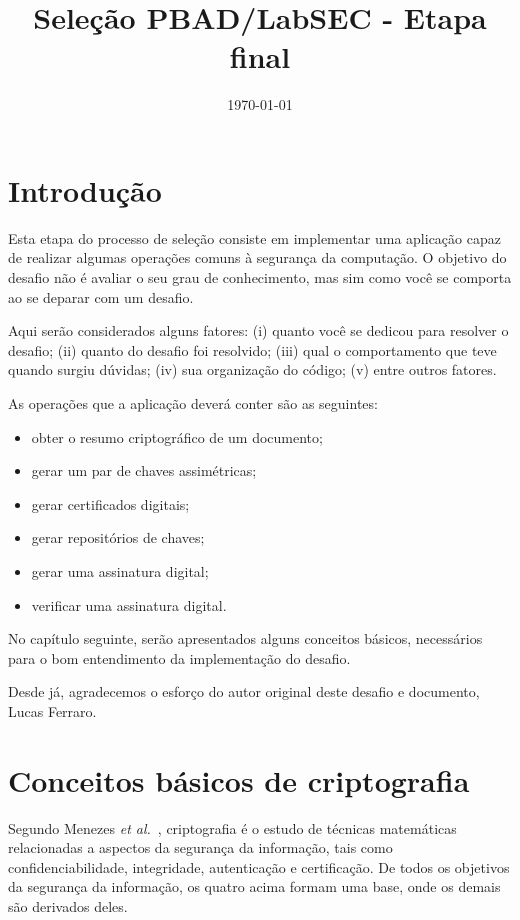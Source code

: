 \documentclass{article}
\title{Seleção PBAD/LabSEC - Etapa final}
\author{}
\date{\today}
\begin{document}
\maketitle

\section{Introdução}\label{sec:intro}

Esta etapa do processo de seleção consiste em implementar uma aplicação capaz
de realizar algumas operações comuns à segurança da computação. O objetivo do
desafio não é avaliar o seu grau de conhecimento, mas sim como você se comporta
ao se deparar com um desafio.

Aqui serão considerados alguns fatores: (i) quanto você se dedicou para
resolver o desafio; (ii) quanto do desafio foi resolvido; (iii) qual
o comportamento que teve quando surgiu dúvidas; (iv) sua organização do código;
(v) entre outros fatores.

As operações que a aplicação deverá conter são as seguintes:

\begin{itemize}
  \item obter o resumo criptográfico de um documento;
  \item gerar um par de chaves assimétricas;
  \item gerar certificados digitais;
  \item gerar repositórios de chaves;
  \item gerar uma assinatura digital;
  \item verificar uma assinatura digital.
\end{itemize}

No capítulo seguinte, serão apresentados alguns conceitos básicos, necessários
para o bom entendimento da implementação do desafio.

Desde já, agradecemos o esforço do autor original deste desafio e documento,
Lucas Ferraro.

\section{Conceitos básicos de criptografia}\label{sec:basiccrypto}

Segundo Menezes \textit{et al.}~\cite{Menezes:book:1996}, criptografia
é o estudo de técnicas matemáticas relacionadas a aspectos da segurança da
informação, tais como confidenciabilidade, integridade, autenticação
e certificação. De todos os objetivos da segurança da informação, os quatro
acima formam uma base, onde os demais são derivados deles.
\end{document}
